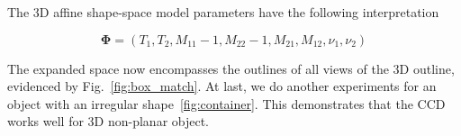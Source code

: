 The 3D affine shape-space model parameters have
the following interpretation

\begin{equation}
  \label{eq:4.19}
  \mathbf{\Phi} =  (T_1, T_2, M_{11} - 1, M_{22} - 1, M_{21}, M_{12}, \nu_1, \nu_2)
\end{equation}

The expanded space now encompasses the outlines of all views of the
3D outline, evidenced by Fig.~\ref{fig:box_match}. At last, we do
another experiments for an object with an irregular shape~\ref{fig:container}. This
demonstrates that the CCD works well for 3D non-planar object.

\begin{figure}[htbp] 
  \begin{minipage}[t]{0.5\linewidth} 
    \centering 
  \end{minipage}%
  \begin{minipage}[t]{0.5\linewidth} 
    \centering 
  \end{minipage} 
  \begin{minipage}[t]{0.5\linewidth} 
    \centering 

\end{minipage}
\end{figure}
